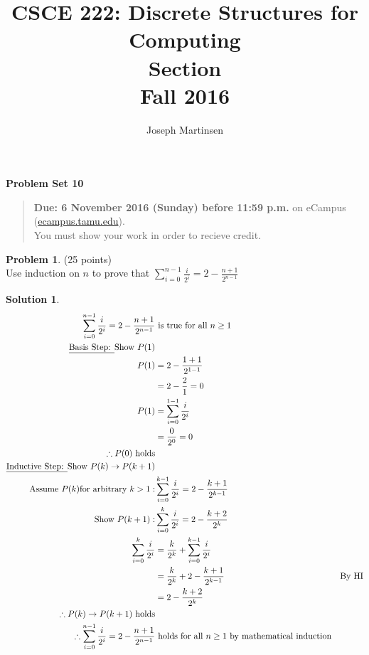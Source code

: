 \documentclass{article}
\title{CSCE 222: Discrete Structures for Computing\\Section \mysectionnumber\\Fall 2016}
\author{Joseph Martinsen}
\theoremstyle{definition}
\newtheorem{problem}{Problem}
\newtheorem*{solution}{Solution}
\newcommand{\problemset}[1]{\begin{center}\textbf{Problem Set #1}\end{center}}
\newcommand{\duedate}[1]{\begin{quote}\textbf{Due: #1} on eCampus (\url{ecampus.tamu.edu}). \\You must show your work in order to recieve credit.\end{quote}}
\begin{document}
\maketitle

\problemset{10}

\duedate{6 November 2016 (Sunday) before 11:59 p.m.}

\bigskip

\begin{problem} (25 points)\\
Use  induction on $n$ to prove that $\displaystyle \sum_{i=0}^{n-1} \frac{i}{2^i} = 2-\frac{n+1}{2^{n-1}}$
\end{problem}

\begin{solution}\ \\

  \begin{align*}
    \displaystyle \sum_{i=0}^{n-1} \frac{i}{2^i} = 2-\frac{n+1}{2^{n-1}}  &\text{ is true for all } n \geq 1 \\
    \text{\underline{Basis Step: }Show } P(1)&\\
    P(1) &= 2-\frac{1+1}{2^{1-1}} \\
    &= 2-\frac{2}{1} = 0\\
    P(1) &= \displaystyle \sum_{i=0}^{1-1} \frac{i}{2^i} \\
    &= \frac{0}{2^0} = 0\\
    \therefore P(0) \text{ holds} \\
    \text{\underline{Inductive Step: }Show }P(k) \rightarrow P(k+1)\\
    \text{Assume } P(k) \text{for arbitrary } k > 1: &\displaystyle \sum_{i=0}^{k-1} \frac{i}{2^i} = 2-\frac{k+1}{2^{k-1}} \\
    \text{Show }P(k+1):& \displaystyle \sum_{i=0}^{k} \frac{i}{2^i} = 2-\frac{k+2}{2^{k}} \\
    \displaystyle \sum_{i=0}^{k} \frac{i}{2^i} &= \frac{k}{2^k} + \displaystyle \sum_{i=0}^{k-1} \frac{i}{2^i} \\
    &= \frac{k}{2^k} + 2-\frac{k+1}{2^{k-1}}&\text{By HI} \\
    &= 2 - \frac{k+2}{2^k} \\
    \therefore P(k) \rightarrow P(k+1) \text{ holds} \\
    \therefore \displaystyle \sum_{i=0}^{n-1} \frac{i}{2^i} = 2-\frac{n+1}{2^{n-1}}  &\text{ holds for all } n \geq 1 \text{ by mathematical induction}
  \end{align*}

\end{solution}
\end{document}
